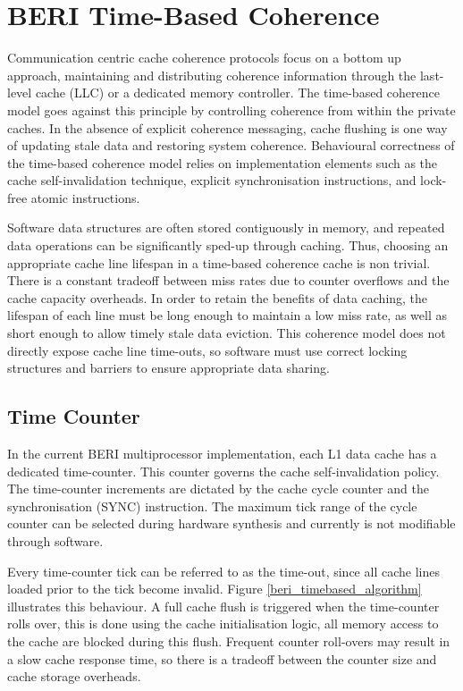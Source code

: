 \clearpage
\section{BERI Time-Based Coherence}
	\label{section_timebased_coherence}
	Communication centric cache coherence protocols focus on a bottom up approach, maintaining and distributing coherence information through the last-level cache (LLC) or a dedicated memory controller.
	The time-based coherence model goes against this principle by controlling coherence from within the private caches.
	In the absence of explicit coherence messaging, cache flushing is one way of updating stale data and restoring system coherence. 
	Behavioural correctness of the time-based coherence model relies on implementation elements such as the cache self-invalidation technique, explicit synchronisation instructions, and lock-free atomic instructions. 

	Software data structures are often stored contiguously in memory, and repeated data operations can be significantly sped-up through caching. Thus, choosing an appropriate cache line lifespan in a time-based coherence cache is non trivial. There is a constant tradeoff between miss rates due to counter overflows and the cache capacity overheads. In order to retain the benefits of data caching, the lifespan of each line must be long enough to maintain a low miss rate, as well as short enough to allow timely stale data eviction. This coherence model does not directly expose cache line time-outs, so software must use correct locking structures and barriers to ensure appropriate data sharing.

	\subsection{Time Counter}
		In the current BERI multiprocessor implementation, each L1 data cache has a dedicated time-counter. This counter governs the cache self-invalidation policy. The time-counter increments are dictated by the cache cycle counter and the synchronisation (SYNC) instruction. 
		The maximum tick range of the cycle counter can be selected during hardware synthesis and currently is not modifiable through software.
		
		Every time-counter tick can be referred to as the time-out, since all cache lines loaded prior to the tick become invalid.
		Figure \ref{beri_timebased_algorithm} illustrates this behaviour.
		A full cache flush is triggered when the time-counter rolls over, this is done using the cache initialisation logic, all memory access to the cache are blocked during this flush. Frequent counter roll-overs may result in a slow cache response time, so there is a tradeoff between the counter size and cache storage overheads. 

